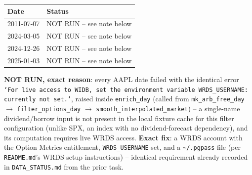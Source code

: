 \begin{tabular}{ll}
\toprule
Date & Status \\
\midrule
2011-07-07 & NOT RUN -- see note below \\
2024-03-05 & NOT RUN -- see note below \\
2024-12-26 & NOT RUN -- see note below \\
2025-01-03 & NOT RUN -- see note below \\
\bottomrule
\end{tabular}

\textbf{NOT RUN, exact reason}: every AAPL date failed with the identical error \texttt{`For live access to WIDB, set the environment variable WRDS\_USERNAME: currently not set.'}, raised inside \texttt{enrich\_day} (called from \texttt{mk\_arb\_free\_day} $\to$ \texttt{filter\_options\_day} $\to$ \texttt{smooth\_interpolated\_market}) -- a single-name dividend/borrow input is not present in the local fixture cache for this filter configuration (unlike SPX, an index with no dividend-forecast dependency), and its computation requires live WRDS access. \textbf{Exact fix}: a WRDS account with the Option Metrics entitlement, \texttt{WRDS\_USERNAME} set, and a \texttt{\textasciitilde/.pgpass} file (per \texttt{README.md}'s WRDS setup instructions) -- identical requirement already recorded in \texttt{DATA\_STATUS.md} from the prior task.